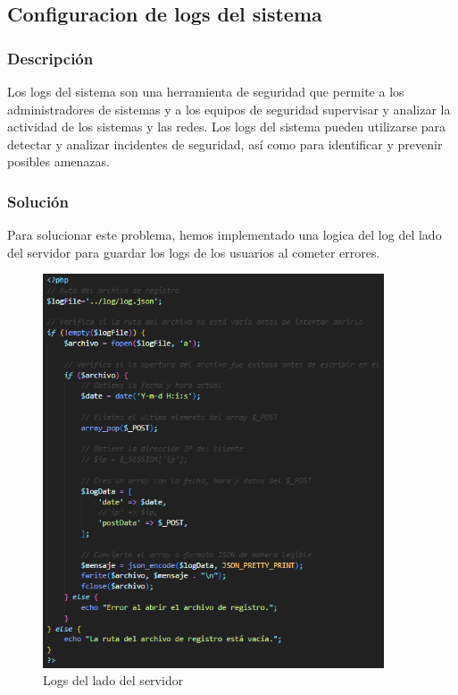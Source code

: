 \documentclass{report}
\begin{document}
            \subsection{Configuracion de logs del sistema}
                \subsubsection{Descripción}
                    Los logs del sistema son una herramienta de seguridad que permite a los administradores de sistemas y a los equipos de seguridad supervisar y analizar la actividad de los sistemas y las redes. Los logs del sistema pueden utilizarse para detectar y analizar incidentes de seguridad, así como para identificar y prevenir posibles amenazas.
                \subsubsection{Solución}
                    Para solucionar este problema, hemos implementado una logica del log del lado del servidor para guardar los logs de los usuarios al cometer errores.
                    \begin{figure}[H]
                        \centering
                        \includegraphics[width=0.9\textwidth]{./img/vulnerabilidades/3.9/2.2.png}
                        \caption{Logs del lado del servidor}
                    \end{figure}
                    
\end{document}
